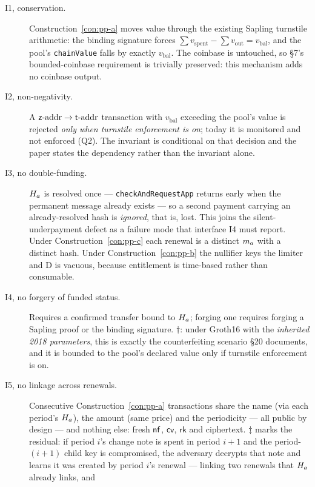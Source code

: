 \begin{description}
  \item[I1, conservation.] Construction~\ref{con:pp-a} moves value through the existing Sapling
    turnstile arithmetic: the binding signature forces
    $\sum v_{\mathrm{spent}} - \sum v_{\mathrm{out}} = v_{\mathrm{bal}}$, and the pool's
    \texttt{chainValue} falls by exactly $v_{\mathrm{bal}}$. The coinbase is untouched, so \S7's
    bounded-coinbase requirement is trivially preserved: this mechanism adds no coinbase output.
  \item[I2, non-negativity.] A $\mathsf{z}\text{-addr} \to \mathsf{t}\text{-addr}$ transaction with $v_{\mathrm{bal}}$ exceeding the
    pool's value is rejected \emph{only when turnstile enforcement is on}; today it is monitored and
    not enforced (Q2). The invariant is conditional on that decision and the paper states the
    dependency rather than the invariant alone.
  \item[I3, no double-funding.] $H_{a}$ is resolved once --- \texttt{check\allowbreak{}And\allowbreak{}Request\allowbreak{}App} returns
    early when the permanent message already exists --- so a second payment carrying an
    already-resolved hash is \emph{ignored}, that is, lost. This joins the silent-underpayment defect
    as a failure mode that interface I4 must report. Under Construction~\ref{con:pp-c} each renewal
    is a distinct $m_{a}$ with a distinct hash. Under Construction~\ref{con:pp-b} the nullifier keys
    the limiter and D is vacuous, because entitlement is time-based rather than consumable.
  \item[I4, no forgery of funded status.] Requires a confirmed transfer bound to $H_{a}$; forging one
    requires forging a Sapling proof or the binding signature. $\dagger$: under Groth16 with the
    \emph{inherited 2018 parameters}, this is exactly the counterfeiting scenario \S20 documents, and
    it is bounded to the pool's declared value only if turnstile enforcement is on.
  \item[I5, no linkage across renewals.] Consecutive Construction~\ref{con:pp-a} transactions share
    the name (via each period's $H_{a}$), the amount (same price) and the periodicity --- all public
    by design --- and nothing else: fresh $\mathsf{nf}$, $\mathsf{cv}$, $\mathsf{rk}$ and ciphertext.
    $\ddagger$ marks the residual: if period $i$'s change note is spent in period $i+1$ and the
    period-$(i{+}1)$ child key is compromised, the adversary decrypts that note and learns it was
    created by period $i$'s renewal --- linking two renewals that $H_{a}$ already links, and

\end{description}

